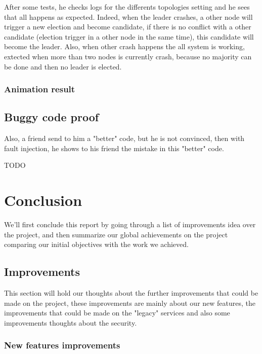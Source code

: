\documentclass{eplmastersthesis}
\begin{document}
          After some tests, he checks logs for the differents topologies setting and he sees that all happens as expected.
          Indeed, when the leader crashes, a other node will trigger a new election and become candidate, if there is
          no conflict with a other candidate (election trigger in a other node in the same time), this candidate will become
          the leader. Also, when other crash happens the all system is working, extected when more than two nodes is
          currently crash, because no majority can be done and then no leader is elected.

        \subsection{Animation result}



      \section{Buggy code proof} %
        Also, a friend send to him a "better" code, but he is not convinced, then with fault injection, he shows to
        his friend the mistake in this "better" code.

        {\color{red} TODO}

  \chapter{Conclusion} %

    We'll first conclude this report by going through a list of improvements
    idea over the project, and then summarize our global achievements on the
    project comparing our initial objectives with the work we achieved.

    \section{Improvements}

      This section will hold our thoughts about the further improvements
      that could be made on the project, these improvements are mainly about
      our new features, the improvements that could be made on the "legacy"
      services and also some improvements thoughts about the security.

      \subsection{New features improvements}
\end{document}

